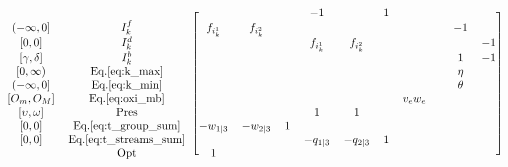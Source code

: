 \begin{equation*}
\begin{blockarray}{cccccccccccc}
\begin{block}{cc[cccccccccc]}
            &                  &                   &                   &
            &-1                &                   & 1                 &
             \\
            {(-\infty,0]}      & I_{k}^{f}         & f_{i_{k}^{1}} &f_{i_{k}^{2}}
            &                  &                   &                   &
            &                  &                   & -1                &
             \\
            {[0,0]}            & I_{k}^{d}         &                   &
            &                  & f_{i_{k}^{1}}     & f_{i_{k}^{2}}     &
            &                  &                   &                   &
            -1 \\
            {[\gamma, \delta]}
                               & I_{k}^{b}         &                   &
            &                  &                   &                   &
            &                  &                   & 1                 &
            -1 \\ 
            {[0, \infty)}      & \text{Eq.}\ref{eq:k_max}&             &
            &                  &                   &                   &
            &                  &                   & \eta              &
             \\
            {(-\infty, 0]}     & \text{Eq.}\ref{eq:k_min} &            &
            &                  &                   &                   &
            &                  &                   & \theta            & 
             \\
            {[O_{m},O_{M}]}    & \text{Eq.}\ref{eq:oxi_mb} &           &
            &                  &                   &                   &
            &v_{e}w_{e}        &                   &                   &
             \\
            {[\upsilon,\omega]} & \text{Pres}      &                   &
            &                  & 1                 & 1                 &
            &                  &                   &                   &
             \\
             {[0,0]}           & \text{Eq.}\ref{eq:t_group_sum} & -w_{1|3} &-w_{2|3}
            &1                 &                   &                &
            &                  &                   &                &
             \\
             {[0,0]}           & \text{Eq.}\ref{eq:t_streams_sum} &  &
            &                  &-q_{1|3}           &-q_{2|3}        &1
            &                 &                   &                &
             \\
                               & \text{Opt}        & 1                 &
            &                  &                   &                   &
            &                  &                   &                   &
             \\
            \end{block}
        \end{blockarray}
    \end{equation*}


